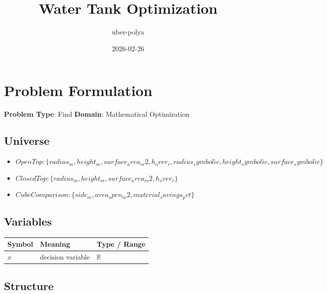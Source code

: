 \documentclass[11pt, a4paper]{article}
\title{Water Tank Optimization}
\author{uber-polya}
\date{2026-02-26}
\begin{document}
\maketitle
\tableofcontents
\newpage

\section{Problem Formulation}

\begin{polyamodel}

\textbf{Problem Type}: Find \hfill
\textbf{Domain}: Mathematical Optimization


\end{polyamodel}

\subsection{Universe}

\begin{itemize}
  \item $Open Top: \{radius_m, height_m, surface_area_m2, h_over_r, radius_symbolic, height_symbolic, surface_symbolic\}$
  \item $Closed Top: \{radius_m, height_m, surface_area_m2, h_over_r\}$
  \item $Cube Comparison: \{side_m, area_open_m2, material_savings_pct\}$
\end{itemize}

\subsection{Variables}

\begin{longtable}{lll}
\toprule
\textbf{Symbol} & \textbf{Meaning} & \textbf{Type / Range} \\
\midrule
\endhead
$x$ & decision variable & $\mathbb{{R}}$ \\
\bottomrule
\end{longtable}

\subsection{Structure}
\end{document}
